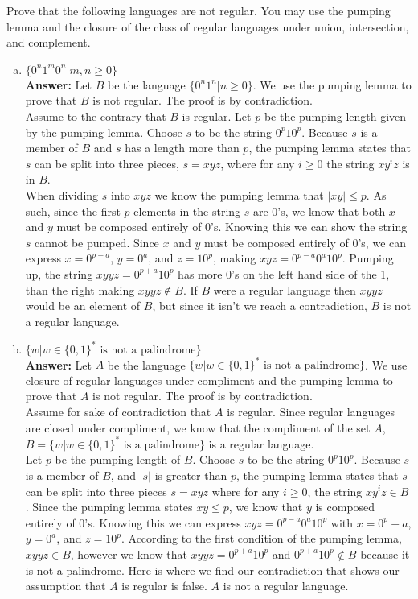 \documentclass{article}
\begin{document}
Prove that the following languages are not regular.
You may use the pumping lemma and the closure of the class of regular 
languages under union, intersection, and complement.
\begin{enumerate}[a.]
\item $\{0^n1^m0^n | m,n \geq 0\}$\\
{\bf Answer: } Let $B$ be the language $\{0^n1^n|n \geq 0 \}$. We use the pumping lemma to prove that $B$ is not regular. The proof is by contradiction. \\
Assume to the contrary that $B$ is regular. Let $p$ be the pumping length given by the pumping lemma. Choose $s$ to be the string $0^p10^p$. Because $s$ is a member of $B$ and $s$ has a length more than $p$, the pumping lemma states that $s$ can be split into three pieces, $s = xyz$, where for any $i \geq 0$ the string $xy^iz$ is in $B$. \\
When dividing $s$ into $xyz$ we know the pumping lemma that $|xy| \leq p$. As such, since the first $p$ elements in the string $s$ are 0's, we know that both $x$ and $y$ must be composed entirely of 0's. Knowing this we can show the string $s$ cannot be pumped. Since $x$ and $y$ must be composed entirely of 0's, we can express $x = 0^{p-a}$, $y = 0^a$, and $z=10^p$, making $xyz = 0^{p-a}0^a10^p$. Pumping up, the string $xyyz = 0^{p+a}10^p$ has more 0's on the left hand side of the 1, than the right making $xyyz \notin B$. If $B$  were a regular language then $xyyz$ would be an element of $B$, but since it isn't we reach a contradiction, $B$ is not a regular language.

\item $\{w | w \in \{0,1\}^* \mbox{\ is not a palindrome}\}$\\
{\bf Answer: } Let $A$ be the language $\{w | w \in \{0,1\}^* \mbox{\ is not a palindrome}\}$. We use closure of regular languages under compliment and the pumping lemma to prove that $A$ is not regular. The proof is by contradiction. \\
Assume for sake of contradiction that $A$ is regular. Since regular languages are closed under compliment, we know that the compliment of the set $A$, $B =  \{w | w \in \{0,1\}^* \mbox{\ is a palindrome}\}$ is a regular language. \\ 
Let $p$ be the pumping length of $B$. Choose $s$ to be the string $0^p10^p$. Because $s$ is a member of $B$, and $|s|$ is greater than $p$, the pumping lemma states that $s$ can be split into three pieces $s=xyz$ where for any $i \geq 0$, the string $xy^iz \in B$. Since the pumping lemma states $xy \leq p$, we know that $y$ is composed entirely of  0's. Knowing this we can express $xyz = 0^{p-a}0^a10^p$ with $x = 0^p-a$, $y=0^a$, and $z=10^p$. According to the first condition of the pumping lemma, $xyyz \in B$, however we know that $xyyz = 0^{p+a}10^p$ and $0^{p+a}10^p \notin B$ because it is not a palindrome. Here is where we find our contradiction that shows our assumption that $A$ is regular is false. $A$ is not a regular language.


\end{enumerate}
\end{document}
